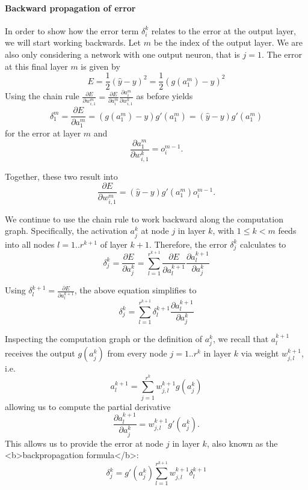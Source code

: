 \paragraph{Backward propagation of error}

In order to show how the error term $\delta^k_i$ relates to the error  at the output layer, we will start working backwards. Let $m$ be the index of the output layer. We are also only considering a network with one output neuron, that is $j=1$. The error at this final layer $m$ is given by
\begin{equation}
E=\frac{1}{2}(\hat{y}-y)^2=\frac{1}{2}(g(a_1^m)-y)^2
\end{equation}
Using the chain rule $\frac{\partial E}{\partial w_{i,1}^m}=\frac{\partial E}{\partial a^m_i}\frac{\partial a^m_i}{\partial w^k_{i,1}}$ as before yields
\begin{equation}
\delta^m_1=\frac{\partial E}{\partial a^m_1}=(g(a^m_1)-y)g'(a^m_1)=(\hat{y}-y)g'(a^m_1)
\end{equation}
for the error at layer $m$ and
\begin{equation}
\frac{\partial a^m_1}{\partial w^k_{i,1}}=o_i^{m-1}.
\end{equation}

Together, these two result into
\begin{equation}
\frac{\partial E}{\partial w_{i,1}^m}=(\hat{y}-y)g'(a^m_1)o_i^{m-1}.
\end{equation}

We continue to use the chain rule to work backward along the computation graph. Specifically, the activation $a^k_j$ at node $j$ in layer $k$, with $1\leq k <m$ feeds into all nodes $l=1..r^{k+1}$ of layer $k+1$. Therefore, the error $\delta^k_j$ calculates to
\begin{equation}
\delta^k_j=\frac{\partial E}{\partial a^k_j}=\sum_{l=1}^{r^{k+1}}\frac{\partial E}{\partial a_l^{k+1}}\frac{\partial a_l^{k+1}}{\partial a^k_j}
\end{equation}

Using $\delta^{k+1}_l=\frac{\partial E}{\partial a_l^{k+1}}$, the above equation simplifies to
\begin{equation}
\delta^k_j=\sum_{l=1}^{r^{k+1}}\delta_l^{k+1}\frac{\partial a_l^{k+1}}{\partial a^k_j}
\end{equation}

Inspecting the computation graph or the definition of $a^k_j$, we recall that $a_l^{k+1}$ receives the output $g(a_j^k)$ from every node $j=1..r^k$ in layer $k$ via weight $w_{j,l}^{k+1}$, i.e.
\begin{equation}
a_l^{k+1}=\sum_{j=1}^{r^k}w_{j,l}^{k+1}g(a_j^k)
\end{equation}
allowing us to compute the partial derivative
\begin{equation}
\frac{\partial a_l^{k+1}}{\partial a^k_j}=w_{j,l}^{k+1}g'(a_j^k).
\end{equation}
This allows us to provide the error at node $j$ in layer $k$, also known as the <b>backpropagation formula</b>:
\begin{equation}
\delta^k_j=g'(a^k_j)\sum_{l=1}^{r^{k+1}}w_{j,l}^{k+1}\delta^{k+1}_l
\end{equation}

